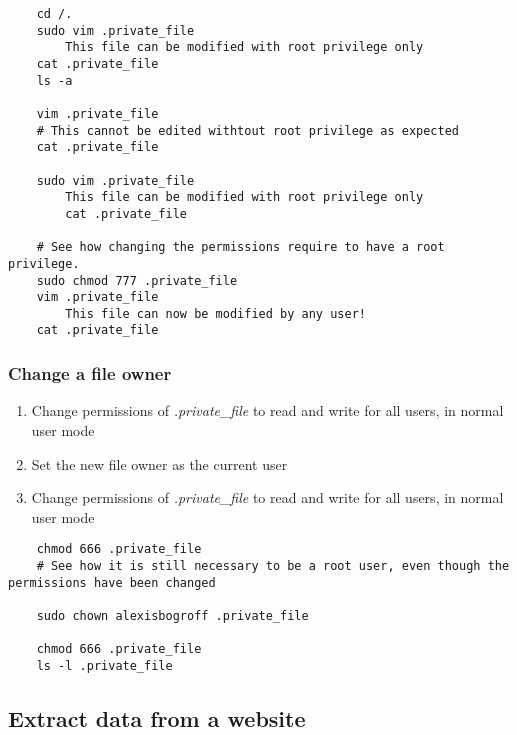 \ifdefined\answer
\begin{verbatim}
    cd /.
    sudo vim .private_file
        This file can be modified with root privilege only
    cat .private_file
    ls -a

    vim .private_file
    # This cannot be edited withtout root privilege as expected
    cat .private_file

    sudo vim .private_file
        This file can be modified with root privilege only
        cat .private_file

    # See how changing the permissions require to have a root privilege.
    sudo chmod 777 .private_file
    vim .private_file
        This file can now be modified by any user!
    cat .private_file
\end{verbatim}
\fi

\subsubsection{Change a file owner}

\begin{enumerate}
    \item Change permissions of \textit{.private\_file} to read and write for all users, in normal user mode
    \item Set the new file owner as the current user
    \item Change permissions of \textit{.private\_file} to read and write for all users, in normal user mode
\end{enumerate}


\ifdefined\answer
\begin{verbatim}
    chmod 666 .private_file
    # See how it is still necessary to be a root user, even though the permissions have been changed

    sudo chown alexisbogroff .private_file

    chmod 666 .private_file
    ls -l .private_file
\end{verbatim}
\fi

\subsection{Extract data from a website}

